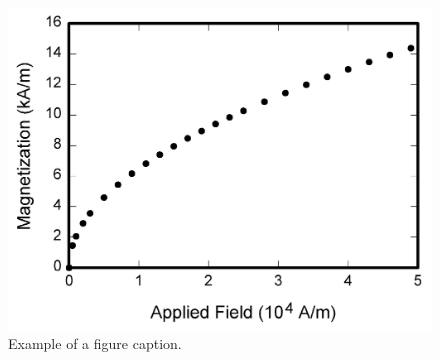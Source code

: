 \documentclass[conference]{IEEEtran}
\begin{document}
\begin{figure}[htbp]
\centerline{\includegraphics{fig1.png}}
\caption{Example of a figure caption.}
\label{fig}
\end{figure}


\cite{bishop2006pattern}



\end{document}
